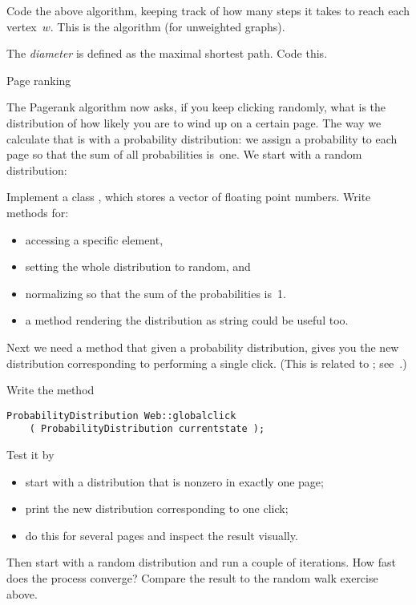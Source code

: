 \begin{exercise}
  \label{ex:SSSD}
  Code the above algorithm, keeping track of how many steps it takes
  to reach each vertex~$w$. This is the  algorithm (for unweighted graphs).

  The \emph{diameter} is defined as the maximal
  shortest path. Code this.
\end{exercise}

 {Page ranking}

The Pagerank algorithm now asks, if you keep clicking randomly, what
is the distribution of how likely you are to wind up on a certain
page. The way we calculate that is with a probability distribution: we
assign a probability to each page so that the sum of all probabilities
is~one. We start with a random distribution:
%

\begin{exercise}
  Implement a class , which stores a vector
  of floating point numbers. Write methods for:
  \begin{itemize}
  \item
    accessing a specific
    element,
  \item setting the whole distribution to random, and
  \item normalizing
    so that the sum of the probabilities is~1.
  \item a method rendering the distribution as string could be useful too.
  \end{itemize}
\end{exercise}

Next we need a method that given a probability distribution,
gives you the new distribution corresponding to performing a single click.
(This is related to ;
see~.)

\begin{exercise}
  Write the method
\begin{lstlisting}
ProbabilityDistribution Web::globalclick
    ( ProbabilityDistribution currentstate );
\end{lstlisting}
Test it by
\begin{itemize}
\item start with a distribution that is nonzero in exactly one page;
\item print the new distribution corresponding to one click;
\item do this for several pages and inspect the result visually.
\end{itemize}
Then start with a random distribution and run a couple of
iterations. How fast does the process converge? Compare the result to
the random walk exercise above.
\end{exercise}

